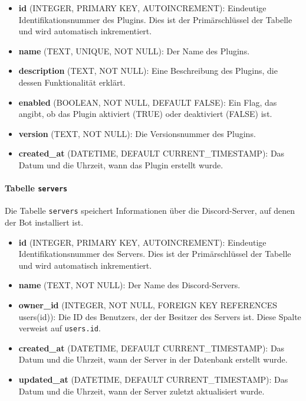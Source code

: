\begin{itemize}
\item
  \textbf{id} (INTEGER, PRIMARY KEY, AUTOINCREMENT): Eindeutige
  Identifikationsnummer des Plugins. Dies ist der Primärschlüssel der
  Tabelle und wird automatisch inkrementiert.
\item
  \textbf{name} (TEXT, UNIQUE, NOT NULL): Der Name des Plugins.
\item
  \textbf{description} (TEXT, NOT NULL): Eine Beschreibung des Plugins,
  die dessen Funktionalität erklärt.
\item
  \textbf{enabled} (BOOLEAN, NOT NULL, DEFAULT FALSE): Ein Flag, das
  angibt, ob das Plugin aktiviert (TRUE) oder deaktiviert (FALSE) ist.
\item
  \textbf{version} (TEXT, NOT NULL): Die Versionsnummer des Plugins.
\item
  \textbf{created\_at} (DATETIME, DEFAULT CURRENT\_TIMESTAMP): Das Datum
  und die Uhrzeit, wann das Plugin erstellt wurde.
\end{itemize}

\paragraph{\texorpdfstring{Tabelle
\texttt{servers}}{Tabelle servers}}\label{tabelle-servers}

Die Tabelle \texttt{servers} speichert Informationen über die
Discord-Server, auf denen der Bot installiert ist.

\begin{itemize}
\item
  \textbf{id} (INTEGER, PRIMARY KEY, AUTOINCREMENT): Eindeutige
  Identifikationsnummer des Servers. Dies ist der Primärschlüssel der
  Tabelle und wird automatisch inkrementiert.
\item
  \textbf{name} (TEXT, NOT NULL): Der Name des Discord-Servers.
\item
  \textbf{owner\_id} (INTEGER, NOT NULL, FOREIGN KEY REFERENCES
  users(id)): Die ID des Benutzers, der der Besitzer des Servers ist.
  Diese Spalte verweist auf \texttt{users.id}.
\item
  \textbf{created\_at} (DATETIME, DEFAULT CURRENT\_TIMESTAMP): Das Datum
  und die Uhrzeit, wann der Server in der Datenbank erstellt wurde.
\item
  \textbf{updated\_at} (DATETIME, DEFAULT CURRENT\_TIMESTAMP): Das Datum
  und die Uhrzeit, wann der Server zuletzt aktualisiert wurde.
\end{itemize}

